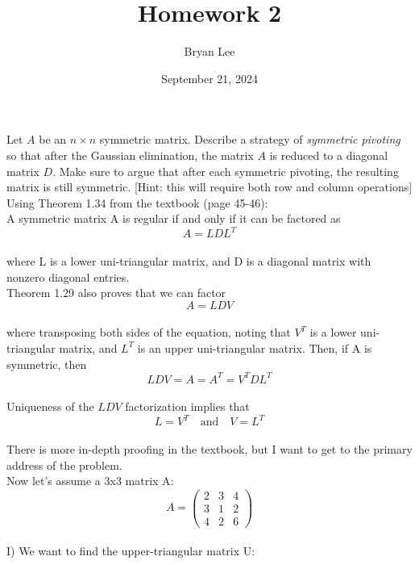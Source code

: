 \documentclass{article}
\title{Homework 2}
\author{Bryan Lee}
\date{September 21, 2024}
\begin{document}
\maketitle

 Let $A$ be an $n \times n$ symmetric matrix. Describe a strategy
of {\it symmetric pivoting} so that after the Gaussian elimination, the matrix
$A$ is reduced to a diagonal matrix $D$. Make sure to argue that after each
symmetric pivoting, the resulting matrix is still symmetric. [Hint: this will
require both row and
column operations]\\

Using Theorem 1.34 from the textbook (page 45-46):\\
A symmetric matrix A is regular if and only if it can be factored as\\
$$ A = LDL^T $$\\
where L is a lower uni-triangular matrix, and D is a diagonal matrix with nonzero diagonal
entries.\\

Theorem 1.29 also proves that we can factor
$$ A = LDV $$\\
where transposing both sides of the equation, noting that $V^T$ is a lower uni-triangular matrix, and $L^T$ is an upper uni-triangular matrix. Then, if A is symmetric, then\\
$$ LDV = A = A^T = V^TDL^T $$\\
Uniqueness of the $LDV$ factorization implies that\\
$$L = V^T \quad \text{and} \quad V = L^T$$\\
There is more in-depth proofing in the textbook, but I want to get to the primary address of the problem.\\

Now let's assume a 3x3 matrix A:\\
$$ A = \left( \begin{array}{rrr} 2 & 3 & 4 \\ 3 & 1 & 2 \\ 4 & 2 & 6 \end{array} \right)$$\\

I) We want to find the upper-triangular matrix U:\\
\end{document}
